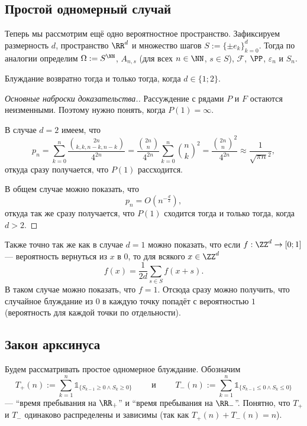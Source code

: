 \documentclass[12pt,a4paper]{article}
\newcommand{\ind}{\ensuremath{\mathds{1}}\xspace}
\begin{document}
    \subsection{Простой одномерный случай}

    Теперь мы рассмотрим ещё одно вероятностное пространство. Зафиксируем размерность $d$, пространство $\RR^d$ и множество шагов $S := \{\pm e_k\}_{k=0}^d$. Тогда по аналогии определим $\Omega := S^\NN$, $A_{n, s}$ (для всех $n \in \NN$, $s \in S$), $\mathcal{F}$, $\PP$, $\varepsilon_n$ и $S_n$.

    \begin{theorem}[Пойа]
        Блуждание возвратно тогда и только тогда, когда $d \in \{1; 2\}$.
    \end{theorem}

    \begin{proof}[Основные наброски доказательства.]
        Рассуждение с рядами $P$ и $F$ остаются неизменными. Поэтому нужно понять, когда $P(1) = \infty$.

        В случае $d = 2$ имеем, что
        \[
            p_n
            = \sum_{k=0}^n \frac{\binom{2n}{k, k, n-k, n-k}}{4^{2n}}
            = \frac{\binom{2n}{n}}{4^{2n}} \sum_{k=0}^n \binom{n}{k}^2
            = \frac{\binom{2n}{n}^2}{4^{2n}}
            \approx \frac{1}{\sqrt{\pi n}^2},
        \]
        откуда сразу получается, что $P(1)$ рассходится.

        В общем случае можно показать, что
        \[p_n = O(n^{-\frac{d}{2}}),\]
        откуда так же сразу получается, что $P(1)$ сходится тогда и только тогда, когда $d > 2$.
    \end{proof}

    Также точно так же как в случае $d = 1$ можно показать, что если $f: \ZZ^d \to [0; 1]$ --- вероятность вернуться из $x$ в $0$, то для всякого $x \in \ZZ^d$ 
    \[f(x) = \frac{1}{2d} \sum_{s \in S} f(x + s).\]
    В таком случае можно показать, что $f = 1$. Отсюда сразу можно получить, что случайное блуждание из $0$ в каждую точку попадёт с вероятностью $1$ (вероятность для каждой точки по отдельности).

    \subsection{Закон арксинуса}

    Будем рассматривать простое одномерное блуждание. Обозначим
    \[
        T_+(n) := \sum_{k=1}^n \ind_{\{S_{k-1} \geqslant 0 \wedge S_k \geqslant 0\}}
        \qquad \text{ и } \qquad
        T_-(n) := \sum_{k=1}^n \ind_{\{S_{k-1} \leqslant 0 \wedge S_k \leqslant 0\}}
    \]
    --- ``время пребывания на $\RR_+$'' и ``время пребывания на $\RR_-$''. Понятно, что $T_+$ и $T_-$ одинаково распределены и зависимы (так как $T_+(n) + T_-(n) = n$).
\end{document}
